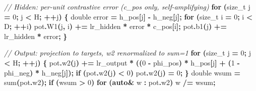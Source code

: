 \documentclass[
  11pt,
  a4paper,
]{article}
\newenvironment{Shaded}{\begin{snugshade}}{\end{snugshade}}
\newcommand{\CommentTok}[1]{\textcolor[rgb]{0.56,0.35,0.01}{\textit{#1}}}
\newcommand{\ControlFlowTok}[1]{\textcolor[rgb]{0.13,0.29,0.53}{\textbf{#1}}}
\newcommand{\DataTypeTok}[1]{\textcolor[rgb]{0.13,0.29,0.53}{#1}}
\newcommand{\DecValTok}[1]{\textcolor[rgb]{0.00,0.00,0.81}{#1}}
\newcommand{\KeywordTok}[1]{\textcolor[rgb]{0.13,0.29,0.53}{\textbf{#1}}}
\newcommand{\NormalTok}[1]{#1}
\newcommand{\OperatorTok}[1]{\textcolor[rgb]{0.81,0.36,0.00}{\textbf{#1}}}
\begin{document}
\begin{Shaded}
\begin{Highlighting}[]
    \CommentTok{// Hidden: per{-}unit contrastive error (c\_pos only, self{-}amplifying)}
    \ControlFlowTok{for} \OperatorTok{(}\DataTypeTok{size\_t}\NormalTok{ j }\OperatorTok{=} \DecValTok{0}\OperatorTok{;}\NormalTok{ j }\OperatorTok{\textless{}}\NormalTok{ H}\OperatorTok{;} \OperatorTok{++}\NormalTok{j}\OperatorTok{)} \OperatorTok{\{}
        \DataTypeTok{double}\NormalTok{ error }\OperatorTok{=}\NormalTok{ h\_pos}\OperatorTok{[}\NormalTok{j}\OperatorTok{]} \OperatorTok{{-}}\NormalTok{ h\_neg}\OperatorTok{[}\NormalTok{j}\OperatorTok{];}
        \ControlFlowTok{for} \OperatorTok{(}\DataTypeTok{size\_t}\NormalTok{ i }\OperatorTok{=} \DecValTok{0}\OperatorTok{;}\NormalTok{ i }\OperatorTok{\textless{}}\NormalTok{ D}\OperatorTok{;} \OperatorTok{++}\NormalTok{i}\OperatorTok{)}
\NormalTok{            pot}\OperatorTok{.}\NormalTok{W1}\OperatorTok{(}\NormalTok{j}\OperatorTok{,}\NormalTok{ i}\OperatorTok{)} \OperatorTok{+=}\NormalTok{ lr\_hidden }\OperatorTok{*}\NormalTok{ error }\OperatorTok{*}\NormalTok{ c\_pos}\OperatorTok{[}\NormalTok{i}\OperatorTok{];}
\NormalTok{        pot}\OperatorTok{.}\NormalTok{b1}\OperatorTok{(}\NormalTok{j}\OperatorTok{)} \OperatorTok{+=}\NormalTok{ lr\_hidden }\OperatorTok{*}\NormalTok{ error}\OperatorTok{;}
    \OperatorTok{\}}

    \CommentTok{// Output: projection to targets, w2 renormalized to sum=1}
    \ControlFlowTok{for} \OperatorTok{(}\DataTypeTok{size\_t}\NormalTok{ j }\OperatorTok{=} \DecValTok{0}\OperatorTok{;}\NormalTok{ j }\OperatorTok{\textless{}}\NormalTok{ H}\OperatorTok{;} \OperatorTok{++}\NormalTok{j}\OperatorTok{)} \OperatorTok{\{}
\NormalTok{        pot}\OperatorTok{.}\NormalTok{w2}\OperatorTok{(}\NormalTok{j}\OperatorTok{)} \OperatorTok{+=}\NormalTok{ lr\_output }\OperatorTok{*} \OperatorTok{((}\DecValTok{0} \OperatorTok{{-}}\NormalTok{ phi\_pos}\OperatorTok{)} \OperatorTok{*}\NormalTok{ h\_pos}\OperatorTok{[}\NormalTok{j}\OperatorTok{]} \OperatorTok{+} \OperatorTok{(}\DecValTok{1} \OperatorTok{{-}}\NormalTok{ phi\_neg}\OperatorTok{)} \OperatorTok{*}\NormalTok{ h\_neg}\OperatorTok{[}\NormalTok{j}\OperatorTok{]);}
        \ControlFlowTok{if} \OperatorTok{(}\NormalTok{pot}\OperatorTok{.}\NormalTok{w2}\OperatorTok{(}\NormalTok{j}\OperatorTok{)} \OperatorTok{\textless{}} \DecValTok{0}\OperatorTok{)}\NormalTok{ pot}\OperatorTok{.}\NormalTok{w2}\OperatorTok{(}\NormalTok{j}\OperatorTok{)} \OperatorTok{=} \DecValTok{0}\OperatorTok{;}
    \OperatorTok{\}}
    \DataTypeTok{double}\NormalTok{ wsum }\OperatorTok{=}\NormalTok{ sum}\OperatorTok{(}\NormalTok{pot}\OperatorTok{.}\NormalTok{w2}\OperatorTok{);}
    \ControlFlowTok{if} \OperatorTok{(}\NormalTok{wsum }\OperatorTok{\textgreater{}} \DecValTok{0}\OperatorTok{)} \ControlFlowTok{for} \OperatorTok{(}\KeywordTok{auto}\OperatorTok{\&}\NormalTok{ w }\OperatorTok{:}\NormalTok{ pot}\OperatorTok{.}\NormalTok{w2}\OperatorTok{)}\NormalTok{ w }\OperatorTok{/=}\NormalTok{ wsum}\OperatorTok{;}


\end{Highlighting}
\end{Shaded}
\end{document}
